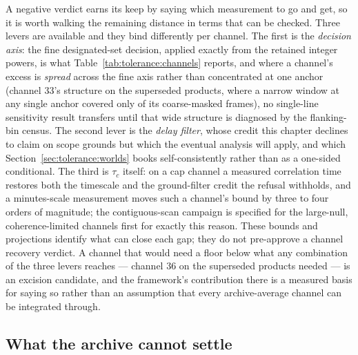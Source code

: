 A negative verdict earns its keep by saying which measurement to go and get, so it is worth walking the remaining distance in terms that can be checked. Three levers are available and they bind differently per channel. The first is the \emph{decision axis}: the fine designated-set decision, applied exactly from the retained integer powers, is what Table~\ref{tab:tolerance:channels} reports, and where a channel's excess is \emph{spread} across the fine axis rather than concentrated at one anchor (channel 33's structure on the superseded products, where a narrow window at any single anchor covered only  of its coarse-masked frames), no single-line sensitivity result transfers until that wide structure is diagnosed by the flanking-bin census. The second lever is the \emph{delay filter}, whose credit this chapter declines to claim on scope grounds but which the eventual analysis will apply, and which Section~\ref{sec:tolerance:worlds} books self-consistently rather than as a one-sided conditional. The third is $\tau_c$ itself: on a cap channel a measured correlation time restores both the timescale and the ground-filter credit the refusal withholds, and a minutes-scale measurement moves such a channel's bound by three to four orders of magnitude; the contiguous-scan campaign is specified for the large-null, coherence-limited channels first for exactly this reason. These bounds and projections identify what can close each gap; they do not pre-approve a channel recovery verdict. A channel that would need a floor below what any combination of the three levers reaches --- channel 36 on the superseded products needed  --- is an excision candidate, and the framework's contribution there is a measured basis for saying so rather than an assumption that every archive-average channel can be integrated through.

\subsection*{What the archive cannot settle}

